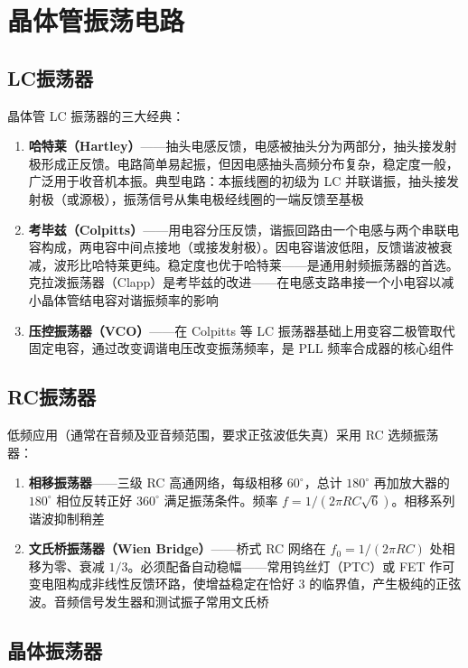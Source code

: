 \documentclass[12pt,UTF8]{ctexbook}
\begin{document}
\section{晶体管振荡电路}
\label{sec:transistor_oscillator}

\subsection{LC振荡器}

晶体管 LC 振荡器的三大经典：
\begin{enumerate}
\item \textbf{哈特莱（Hartley）}——抽头电感反馈，电感被抽头分为两部分，抽头接发射极形成正反馈。电路简单易起振，但因电感抽头高频分布复杂，稳定度一般，广泛用于收音机本振。典型电路：本振线圈的初级为 LC 并联谐振，抽头接发射极（或源极），振荡信号从集电极经线圈的一端反馈至基极
\item \textbf{考毕兹（Colpitts）}——用电容分压反馈，谐振回路由一个电感与两个串联电容构成，两电容中间点接地（或接发射极）。因电容谐波低阻，反馈谐波被衰减，波形比哈特莱更纯。稳定度也优于哈特莱——是通用射频振荡器的首选。克拉泼振荡器（Clapp）是考毕兹的改进——在电感支路串接一个小电容以减小晶体管结电容对谐振频率的影响
\item \textbf{压控振荡器（VCO）}——在 Colpitts 等 LC 振荡器基础上用变容二极管取代固定电容，通过改变调谐电压改变振荡频率，是 PLL 频率合成器的核心组件
\end{enumerate}

\subsection{RC振荡器}

低频应用（通常在音频及亚音频范围，要求正弦波低失真）采用 RC 选频振荡器：
\begin{enumerate}
\item \textbf{相移振荡器}——三级 RC 高通网络，每级相移 $60^\circ$，总计 $180^\circ$ 再加放大器的 $180^\circ$ 相位反转正好 $360^\circ$ 满足振荡条件。频率 $f = 1/(2\pi RC\sqrt{6})$。相移系列谐波抑制稍差
\item \textbf{文氏桥振荡器（Wien Bridge）}——桥式 RC 网络在 $f_0 = 1/(2\pi RC)$ 处相移为零、衰减 $1/3$。必须配备自动稳幅——常用钨丝灯（PTC）或 FET 作可变电阻构成非线性反馈环路，使增益稳定在恰好 $3$ 的临界值，产生极纯的正弦波。音频信号发生器和测试振子常用文氏桥
\end{enumerate}

\subsection{晶体振荡器}
\end{document}
